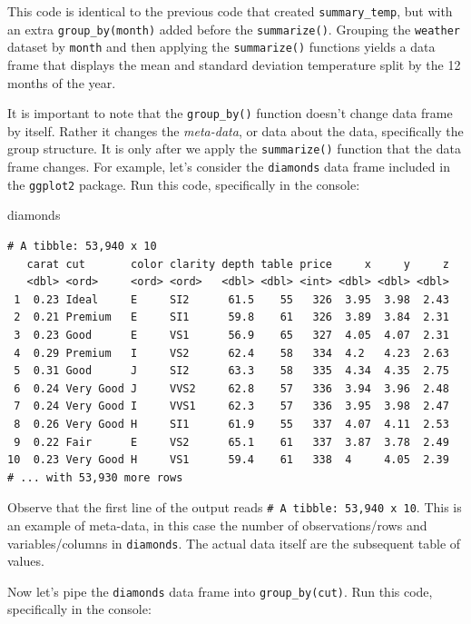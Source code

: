 \documentclass[
  letterpaper,
  DIV=11,
  numbers=noendperiod]{scrreprt}
\newenvironment{Shaded}{\begin{snugshade}}{\end{snugshade}}
\newcommand{\NormalTok}[1]{\textcolor[rgb]{0.00,0.23,0.31}{#1}}
\theoremstyle{definition}
\theoremstyle{remark}
\begin{document}
This code is identical to the previous code that created
\texttt{summary\_temp}, but with an extra \texttt{group\_by(month)}
added before the \texttt{summarize()}. Grouping the \texttt{weather}
dataset by \texttt{month} and then applying the \texttt{summarize()}
functions yields a data frame that displays the mean and standard
deviation temperature split by the 12 months of the year.

It is important to note that the \texttt{group\_by()} function doesn't
change data frame by itself. Rather it changes the \emph{meta-data}, or
data about the data, specifically the group structure. It is only after
we apply the \texttt{summarize()} function that the data frame changes.
For example, let's consider the \texttt{diamonds} data frame included in
the \texttt{ggplot2} package. Run this code, specifically in the
console:

\begin{Shaded}
\begin{Highlighting}[]
\NormalTok{diamonds}
\end{Highlighting}
\end{Shaded}

\begin{verbatim}
# A tibble: 53,940 x 10
   carat cut       color clarity depth table price     x     y     z
   <dbl> <ord>     <ord> <ord>   <dbl> <dbl> <int> <dbl> <dbl> <dbl>
 1  0.23 Ideal     E     SI2      61.5    55   326  3.95  3.98  2.43
 2  0.21 Premium   E     SI1      59.8    61   326  3.89  3.84  2.31
 3  0.23 Good      E     VS1      56.9    65   327  4.05  4.07  2.31
 4  0.29 Premium   I     VS2      62.4    58   334  4.2   4.23  2.63
 5  0.31 Good      J     SI2      63.3    58   335  4.34  4.35  2.75
 6  0.24 Very Good J     VVS2     62.8    57   336  3.94  3.96  2.48
 7  0.24 Very Good I     VVS1     62.3    57   336  3.95  3.98  2.47
 8  0.26 Very Good H     SI1      61.9    55   337  4.07  4.11  2.53
 9  0.22 Fair      E     VS2      65.1    61   337  3.87  3.78  2.49
10  0.23 Very Good H     VS1      59.4    61   338  4     4.05  2.39
# ... with 53,930 more rows
\end{verbatim}

Observe that the first line of the output reads
\texttt{\#\ A\ tibble:\ 53,940\ x\ 10}. This is an example of meta-data,
in this case the number of observations/rows and variables/columns in
\texttt{diamonds}. The actual data itself are the subsequent table of
values.

Now let's pipe the \texttt{diamonds} data frame into
\texttt{group\_by(cut)}. Run this code, specifically in the console:
\end{document}
